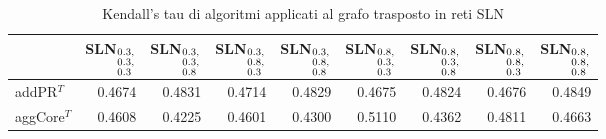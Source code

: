 \begin{table}[!htbp]
  \caption{Kendall's tau di algoritmi applicati al grafo trasposto in reti SLN}
  \label{tab:tauslnT}
    \centering
    \begin{tabular}{lrrrrrrrr}
        \toprule
          & SLN$_{\begin{subarray}{l} 0.3\text{,} \\ 0.3\text{,} \\ 0.3 \end{subarray}}$ 
          & SLN$_{\begin{subarray}{l} 0.3\text{,} \\ 0.3\text{,} \\ 0.8 \end{subarray}}$ 
          & SLN$_{\begin{subarray}{l} 0.3\text{,} \\ 0.8\text{,} \\ 0.3 \end{subarray}}$ 
          & SLN$_{\begin{subarray}{l} 0.3\text{,} \\ 0.8\text{,} \\ 0.8 \end{subarray}}$ 
          & SLN$_{\begin{subarray}{l} 0.8\text{,} \\ 0.3\text{,} \\ 0.3 \end{subarray}}$ 
          & SLN$_{\begin{subarray}{l} 0.8\text{,} \\ 0.3\text{,} \\ 0.8 \end{subarray}}$ 
          & SLN$_{\begin{subarray}{l} 0.8\text{,} \\ 0.8\text{,} \\ 0.3 \end{subarray}}$ 
          & SLN$_{\begin{subarray}{l} 0.8\text{,} \\ 0.8\text{,} \\ 0.8 \end{subarray}}$ \\
        \midrule
          addPR$^T$ &    {\num{ 0.4674}} &   {\num{ 0.4831}} &   {\num{ 0.4714}} &   {\num{ 0.4829}} &   {\num{ 0.4675}} &   {\num{ 0.4824}} &   {\num{ 0.4676}} &   {\num{ 0.4849}} \\
        aggCore$^T$ &    {\num{ 0.4608}} &   {\num{ 0.4225}} &   {\num{ 0.4601}} &   {\num{ 0.4300}} &   {\num{ 0.5110}} &   {\num{ 0.4362}} &   {\num{ 0.4811}} &   {\num{ 0.4663}} \\

\end{tabular}
\end{table}
